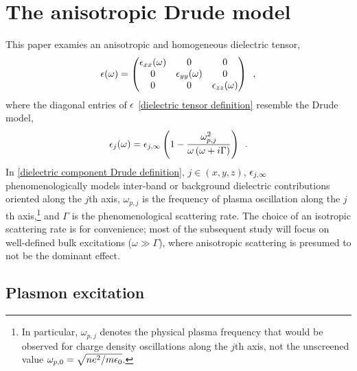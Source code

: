 \section{The anisotropic Drude model}

This paper examies an anisotropic and homogeneous dielectric tensor,
\begin{equation}
    \label{dielectric tensor definition}
    \epsilon(\omega) = \begin{pmatrix}
    \epsilon_{xx}(\omega) & 0 & 0
    \\ 0 & \epsilon_{yy}(\omega) & 0
    \\ 0 & 0 & \epsilon_{zz}(\omega)
    \end{pmatrix}
    \,\,\,,
\end{equation}
where the diagonal entries of $\epsilon$ \eqref{dielectric tensor definition} resemble the Drude model,
\begin{equation}
    \label{dielectric component Drude definition}
    \epsilon_j(\omega) = \epsilon_{j,\infty}\left( 1-\frac{\omega_{p,j}^2}{\omega\left(\omega+i\Gamma\right)}\right)\,\,\,.
\end{equation}
In \eqref{dielectric component Drude definition}, $j\in(x,y,z)$, $\epsilon_{j,\infty}$ phenomenologically models inter-band or background dielectric contributions oriented along the $j$th axis, $\omega_{p,j}$ is the frequency of plasma oscillation along the $j$th axis,\footnote{In particular, $\omega_{p,j}$ denotes the physical plasma frequency that would be observed for charge density oscillations along the $j$th axis, not the unscreened value $\omega_{p,0}=\sqrt{ne^2/m\epsilon_0}$.} and $\Gamma$ is the phenomenological scattering rate.  The choice of an isotropic scattering rate is for convenience; most of the subsequent study will focus on well-defined bulk excitations ($\omega\gg\Gamma$), where anisotropic scattering is presumed to not be the dominant effect.






\subsection{Plasmon excitation}

